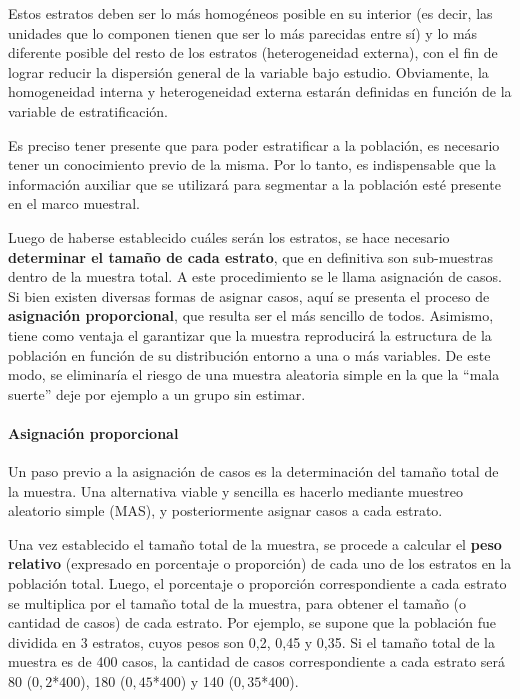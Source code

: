 \documentclass[
]{book}
\begin{document}
Estos estratos deben ser lo más homogéneos posible en su interior (es decir, las unidades que lo componen tienen que ser lo más parecidas entre sí) y lo más diferente posible del resto de los estratos (heterogeneidad externa), con el fin de lograr reducir la dispersión general de la variable bajo estudio. Obviamente, la homogeneidad interna y heterogeneidad externa estarán definidas en función de la variable de estratificación.

Es preciso tener presente que para poder estratificar a la población, es necesario tener un conocimiento previo de la misma. Por lo tanto, es indispensable que la información auxiliar que se utilizará para segmentar a la población esté presente en el marco muestral.

Luego de haberse establecido cuáles serán los estratos, se hace necesario \textbf{determinar el tamaño de cada estrato}, que en definitiva son sub-muestras dentro de la muestra total. A este procedimiento se le llama asignación de casos. Si bien existen diversas formas de asignar casos, aquí se presenta el proceso de \textbf{asignación proporcional}, que resulta ser el más sencillo de todos. Asimismo, tiene como ventaja el garantizar que la muestra reproducirá la estructura de la población en función de su distribución entorno a una o más variables. De este modo, se eliminaría el riesgo de una muestra aleatoria simple en la que la ``mala suerte'' deje por ejemplo a un grupo sin estimar.

\hypertarget{asignaciuxf3n-proporcional}{%
\paragraph{Asignación proporcional}\label{asignaciuxf3n-proporcional}}

Un paso previo a la asignación de casos es la determinación del tamaño total de la muestra. Una alternativa viable y sencilla es hacerlo mediante muestreo aleatorio simple (MAS), y posteriormente asignar casos a cada estrato.

Una vez establecido el tamaño total de la muestra, se procede a calcular el \textbf{peso relativo} (expresado en porcentaje o proporción) de cada uno de los estratos en la población total. Luego, el porcentaje o proporción correspondiente a cada estrato se multiplica por el tamaño total de la muestra, para obtener el tamaño (o cantidad de casos) de cada estrato. Por ejemplo, se supone que la población fue dividida en 3 estratos, cuyos pesos son 0,2, 0,45 y 0,35. Si el tamaño total de la muestra es de 400 casos, la cantidad de casos correspondiente a cada estrato será 80 (\(0,2\)*\(400\)), 180 (\(0,45\)*\(400\)) y 140 (\(0,35\)*\(400\)).
\end{document}
